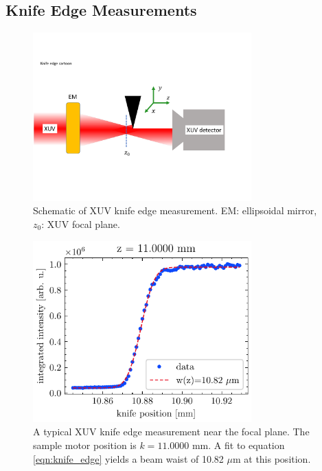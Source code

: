 \subsection{Knife Edge Measurements}

\begin{figure}
	\centering
	\includegraphics[width=0.75\textwidth]{figures/chap3/knife_edge_cartoon.pdf}
	\caption{Schematic of XUV knife edge measurement. EM: ellipsoidal mirror, $z_0$: XUV focal plane.}
	\label{fig:knife_edge_cartoon}
\end{figure}

\begin{figure}
	\centering
	\includegraphics[width=0.75\textwidth]{figures/chap3/XUV_focus_knife_edge.pdf}
	\caption{A typical XUV knife edge measurement near the focal plane. The sample motor position is $k=11.0000$ mm. A fit to equation \cref{eqn:knife_edge} yields a beam waist of 10.82 $\mu$m at this position.}
	\label{fig:XUV_focus_knife_edge}
\end{figure}

